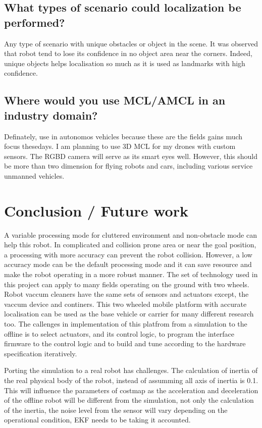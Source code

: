 \documentclass[10pt,journal,compsoc]{IEEEtran}
\begin{document}
\subsection{What types of scenario could localization be performed?}
Any type of scenario with unique obstacles or object in the scene. It was observed that robot tend to lose its confidence in no object area near the corners. Indeed, unique objects helps localisation so much as it is used as landmarks with high confidence.
\subsection{Where would you use MCL/AMCL in an industry domain?}
Definately, use in autonomos vehicles because these are the fields gains much focus thesedays. I am planning to use 3D MCL for my drones with custom sensors. The RGBD camera will serve as its smart eyes well.
However, this should be more than two dimension for flying robots and cars, including various service unmanned vehicles.


\section{Conclusion / Future work}

A variable processing mode for cluttered environment and non-obstacle mode can help this robot. In complicated and collision prone area or near the goal position, a processing with more accuracy can prevent the robot collision. However, a low accuracy mode can be the default processing mode and it can save resource and make the robot operating in a more robust manner.
The set of technology used in this project can apply to many fields operating on the ground with two wheels. Robot vaccum cleaners have the same sets of sensors and actuators except, the vaccum device and continers. This two wheeled mobile platform with accurate localisation can be used as the base vehicle or carrier for many different research too. The callenges in implementation of this platfrom from a simulation to the offline is to select actuators, and its control logic, to program the interface firmware to the control logic and to build and tune according to the hardware specification iteratively.

Porting the simulation to a real robot has challenges. The calculation of inertia of the real physical body of the robot, instead of assumming all axis of inertia is 0.1. This will influence the parameters of costmap as the acceleration and deceleration of the offline robot will be different from the simulation, not only the calculation of the inertia, the noise level from the sensor will vary depending on the operational condition, EKF needs to be taking it accounted.
\end{document}
